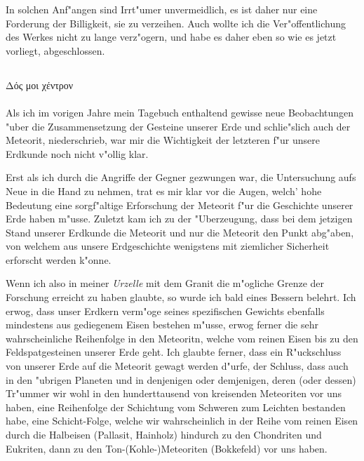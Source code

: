 \documentclass[a4paper, 11pt, oneside]{article}
\begin{document}
In solchen Anf"angen sind Irrt"umer unvermeidlich, es ist daher nur eine Forderung der Billigkeit, sie zu verzeihen. Auch wollte ich die Ver"offentlichung des Werkes nicht zu lange verz"ogern, und habe es daher eben so wie es jetzt vorliegt, abgeschlossen.
\clearpage
\subsection{}
Δός μοι χέντρον%
\paragraph{}
Als ich im vorigen Jahre mein Tagebuch enthaltend gewisse neue Beobachtungen "uber die Zusammensetzung der Gesteine unserer Erde und schlie"slich auch der Meteorit, niederschrieb, war mir die Wichtigkeit der letzteren f"ur unsere Erdkunde noch nicht v"ollig klar.

Erst als ich durch die Angriffe der Gegner gezwungen war, die Untersuchung aufs Neue in die Hand zu nehmen, trat es mir klar vor die Augen, welch' hohe Bedeutung eine sorgf"altige Erforschung der Meteorit f"ur die Geschichte unserer Erde haben m"usse. Zuletzt kam ich zu der "Uberzeugung, dass bei dem jetzigen Stand unserer Erdkunde die Meteorit und nur die Meteorit den Punkt abg"aben, von welchem aus unsere Erdgeschichte wenigstens mit ziemlicher Sicherheit erforscht werden k"onne.

Wenn ich also in meiner \emph{Urzelle} mit dem Granit die m"ogliche Grenze der Forschung erreicht zu haben glaubte, so wurde ich bald eines Bessern belehrt. Ich erwog, dass unser Erdkern verm"oge seines spezifischen Gewichts ebenfalls mindestens aus gediegenem Eisen bestehen m"usse, erwog ferner die sehr wahrscheinliche Reihenfolge in den Meteoritn, welche vom reinen Eisen bis zu den Feldspatgesteinen unserer Erde geht. Ich glaubte ferner, dass ein R"uckschluss von unserer Erde auf die Meteorit gewagt werden d"urfe, der Schluss, dass auch in den "ubrigen Planeten und in denjenigen oder demjenigen, deren (oder dessen) Tr"ummer wir wohl in den hunderttausend von kreisenden Meteoriten vor uns haben, eine Reihenfolge der Schichtung vom Schweren zum Leichten bestanden habe, eine Schicht-Folge, welche wir wahrscheinlich in der Reihe vom reinen Eisen durch die Halbeisen (Pallasit, Hainholz) hindurch zu den Chondriten und Eukriten, dann zu den Ton-(Kohle-)Meteoriten (Bokkefeld) vor uns haben.
\end{document}
